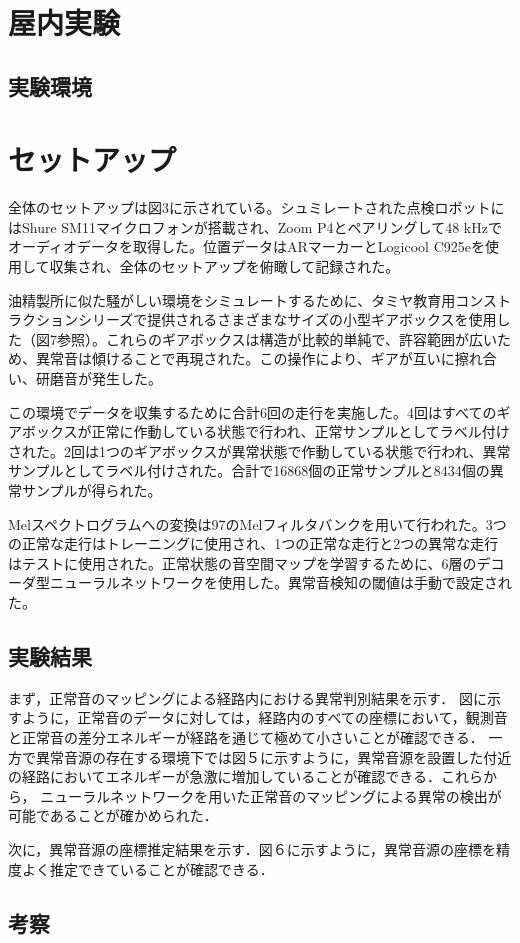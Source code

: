 \documentclass[../main]{subfiles}
\begin{document}
\section{屋内実験}
\label{sec:vexp_spectral-reflectance}

\subsection{実験環境}
\label{subsec:vexp_ref_environmet}
\section{セットアップ}

全体のセットアップは図3に示されている。シュミレートされた点検ロボットにはShure SM11マイクロフォンが搭載され、Zoom P4とペアリングして48 kHzでオーディオデータを取得した。位置データはARマーカーとLogicool C925eを使用して収集され、全体のセットアップを俯瞰して記録された。

油精製所に似た騒がしい環境をシミュレートするために、タミヤ教育用コンストラクションシリーズで提供されるさまざまなサイズの小型ギアボックスを使用した（図7参照）。これらのギアボックスは構造が比較的単純で、許容範囲が広いため、異常音は傾けることで再現された。この操作により、ギアが互いに擦れ合い、研磨音が発生した。

この環境でデータを収集するために合計6回の走行を実施した。4回はすべてのギアボックスが正常に作動している状態で行われ、正常サンプルとしてラベル付けされた。2回は1つのギアボックスが異常状態で作動している状態で行われ、異常サンプルとしてラベル付けされた。合計で16868個の正常サンプルと8434個の異常サンプルが得られた。

Melスペクトログラムへの変換は97のMelフィルタバンクを用いて行われた。3つの正常な走行はトレーニングに使用され、1つの正常な走行と2つの異常な走行はテストに使用された。正常状態の音空間マップを学習するために、6層のデコーダ型ニューラルネットワークを使用した。異常音検知の閾値は手動で設定された。


\subsection{実験結果}
まず，正常音のマッピングによる経路内における異常判別結果を示す．
図に示すように，正常音のデータに対しては，経路内のすべての座標において，観測音と正常音の差分エネルギーが経路を通じて極めて小さいことが確認できる．
一方で異常音源の存在する環境下では図５に示すように，異常音源を設置した付近の経路においてエネルギーが急激に増加していることが確認できる．これらから，
ニューラルネットワークを用いた正常音のマッピングによる異常の検出が可能であることが確かめられた．

次に，異常音源の座標推定結果を示す．図６に示すように，異常音源の座標を精度よく推定できていることが確認できる．
\subsection{考察}


\label{subsec:vexp_ref_result}
\end{document}
